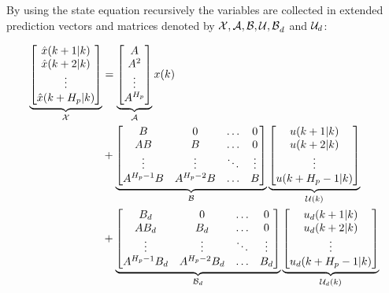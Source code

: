 By using the state equation recursively the variables are collected in extended prediction vectors and matrices denoted by $\CMcal{X,A,B,U,B}_d$ and $\CMcal{U}_d$:


\begin{equation}
\begin{aligned}
	  \underbrace{\begin{bmatrix}
	  \hat{x}(k+1|k) 	\\
	  \hat{x}(k+2|k) 	\\
	  \vdots 			\\
	  \hat{x}(k+H_p|k) 	\\
	   \end{bmatrix}}_{\CMcal{X}}
	 &=
	\underbrace{\begin{bmatrix}
		A \\
		A^2 \\
		\vdots \\
		A^{H_p} \\
	\end{bmatrix}}_{\CMcal{A}}
	x(k) \\&+
	\underbrace{\begin{bmatrix}
		B 		 &0			 &\hdots	& 0		\\
		AB  	 &B  		 & \hdots& 0		\\
		\vdots 	 &\vdots	 & \ddots&\vdots	\\
		A^{H_p-1}B&A^{H_p-2}B&\hdots &B 
    \end{bmatrix}}_{\CMcal{B}}
    	\underbrace{\begin{bmatrix}
	u(k+1|k)\\
	u(k+2|k)\\
	\vdots\\
	u(k+H_p-1|k)
	\end{bmatrix}}_{\CMcal{U}(k)} \\ &+ 
    \underbrace{\begin{bmatrix}
    	B_d 	    &0	         &\hdots & 0		\\
		AB_d  	    &B_d  	     & \hdots& 0		\\
		\vdots 	    &\vdots	     & \ddots&\vdots	\\
		A^{H_p-1}B_d&A^{H_p-2}B_d&\hdots &B_d 
	  \end{bmatrix}}_{\CMcal{B}_d} 
	\underbrace{\begin{bmatrix}
	u_d(k+1|k)\\
	u_d(k+2|k)\\
	\vdots\\
	u_d(k+H_p-1|k)
	\end{bmatrix}}_{\CMcal{U}_d(k)}
	\end{aligned}
\end{equation}
